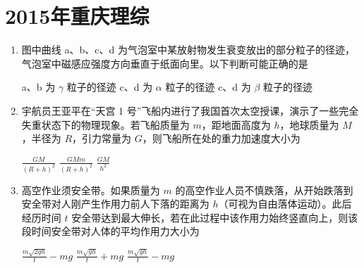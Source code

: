 \documentclass[\gkver]{gaokaozhenti}
\begin{document}
\chapter{2015年重庆理综}

\begin{enumerate}
\item
图中曲线 a、b、c、d 为气泡室中某放射物发生衰变放出的部分粒子的径迹，气泡室中磁感应强度方向垂直于纸面向里。以下判断可能正确的是


{a、b 为 $\gamma$ 粒子的径迹}
{c、d 为 $\alpha$ 粒子的径迹}
{c、d 为 $\beta$ 粒子的径迹}


\item
宇航员王亚平在“天宫 1 号”飞船内进行了我国首次太空授课，演示了一些完全失重状态下的物理现象。若飞船质量为 $m$，距地面高度为 $h$，地球质量为 $M$，半径为 $R$，引力常量为 $G$，则飞船所在处的重力加速度大小为

{$\frac{GM}{(R+h)^{2}}$}
{$\frac{GMm}{(R+h)^{2}}$}
{$\frac{GM}{h^{2}}$}


\item
高空作业须安全带。如果质量为 $m$ 的高空作业人员不慎跌落，从开始跌落到安全带对人刚产生作用力前人下落的距离为 $h$（可视为自由落体运动）。此后经历时间 $t$ 安全带达到最大伸长，若在此过程中该作用力始终竖直向上，则该段时间安全带对人体的平均作用力大小为

{$\frac{m\sqrt{2gh}}{t}-mg$}
{$\frac{m\sqrt{gh}}{t}+mg$}
{$\frac{m\sqrt{gh}}{t}-mg$}



\end{enumerate}
\end{document}
